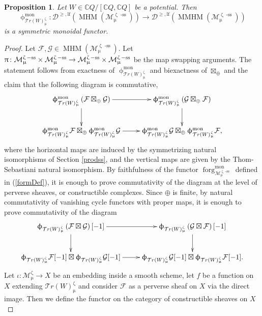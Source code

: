 \documentclass[a4paper,10pt]{amsart}
\renewcommand{\zeta}{\upzeta}
\renewcommand{\pi}{\uppi\hspace{0.05em}}
\renewcommand{\phi}{\upphi}
\renewcommand{\mu}{\upmu}
\newtheorem{proposition}[theorem]{Proposition}
\newcommand{\WW}{\mathcal{T}r(W)}
\newcommand{\Msp}{\mathcal{M}}
\newcommand{\phim}[1]{\phi^{\mon}_{#1}}
\DeclareMathOperator{\sst}{-ss}
\DeclareMathOperator{\mon}{mon}
\DeclareMathOperator{\MMHM}{MMHM}
\DeclareMathOperator{\MHM}{MHM}
\DeclareMathOperator{\forg}{forg}
\newcommand{\form}[1]{\forg^{\mon}_{#1}}
\newcommand{\Dulf}{\mathcal{D}^{\geq, \mathrm{lf}}}
\begin{document}
\begin{proposition}\label{TSeq}
Let $W\in\mathbb{C}Q/[\mathbb{C}Q,\mathbb{C}Q]$ be a potential.  Then 
\[
\phim{\WW_{\mu}^{\zeta}}\colon\Dulf\left(\MHM(\Msp^{\zeta\sst}_{\mu})\right)\rightarrow\Dulf\left(\MMHM(\Msp^{\zeta\sst}_{\mu})\right)
\]
is a symmetric monoidal functor.
\end{proposition}
\begin{proof}
Let $\mathcal{F},\mathcal{G}\in\MHM(\Msp^{\zeta\sst}_{\mu})$.  Let $\pi\colon \Msp^{\zeta\sst}_{\mu}\times\Msp^{\zeta\sst}_{\mu}\rightarrow\Msp^{\zeta\sst}_{\mu}\times\Msp^{\zeta\sst}_{\mu}$ be the map swapping arguments.  The statement follows from exactness of $\phim{\WW_{\mu}^{\zeta}}$ and biexactness of $\boxtimes_{\oplus}$ and the claim that the following diagram is commutative,
\[
\xymatrix{
\phim{\WW_{\mu}^{\zeta}}\left(\mathcal{F}\boxtimes_{\oplus}\mathcal{G}\right)\ar[r]\ar[d]&\phim{\WW_{\mu}^{\zeta}}\left(\mathcal{G}\boxtimes_{\oplus}\mathcal{F}\right)\ar[d]\\
\phim{\WW_{\mu}^{\zeta}}\mathcal{F}\boxtimes_{\oplus}\phim{\WW_{\mu}^{\zeta}}\mathcal{G}\ar[r]&\phim{\WW_{\mu}^{\zeta}}\mathcal{G}\boxtimes_{\oplus}\phim{\WW_{\mu}^{\zeta}}\mathcal{F},
}
\]
where the horizontal maps are induced by the symmetrizing natural isomorphisms of Section \ref{prodss}, and the vertical maps are given by the Thom-Sebastiani natural isomorphism.  By faithfulness of the functor $\form{\Msp_{\mu}^{\zeta\sst}}$ defined in (\ref{formDef}), it is enough to prove commutativity of the diagram at the level of perverse sheaves, or constructible complexes.  Since $\oplus$ is finite, by natural commutativity of vanishing cycle functors with proper maps, it is enough to prove commutativity of the diagram
\begin{equation}
\label{liftSymTS}
\xymatrix{
\phi_{\WW_{\mu}^{\zeta}}\left(\mathcal{F}\boxtimes\mathcal{G}\right)[-1]\ar[r]\ar[d]&\phi_{\WW_{\mu}^{\zeta}}\left(\mathcal{G}\boxtimes\mathcal{F}\right)[-1]\ar[d]\\
\phi_{\WW_{\mu}^{\zeta}}\mathcal{F}[-1]\boxtimes\phi_{\WW_{\mu}^{\zeta}}\mathcal{G}[-1]\ar[r]&\phi_{\WW_{\mu}^{\zeta}}\mathcal{G}[-1]\boxtimes\phi_{\WW_{\mu}^{\zeta}}\mathcal{F}[-1].
}
\end{equation}
Let $\iota\colon\Msp_{\mu}^{\zeta}\rightarrow X$ be an embedding inside a smooth scheme, let $f$ be a function on $X$ extending $\WW_{\mu}^{\zeta}$ and consider $\mathcal{F}$ as a perverse sheaf on $X$ via the direct image.  Then we define the functor on the category of constructible sheaves on $X$

\end{proof}
\end{document}
